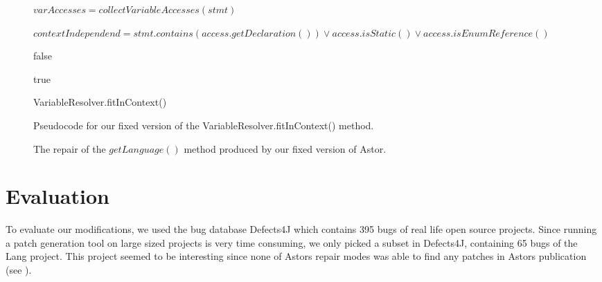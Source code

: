 \documentclass[pdftex,english,oribibl]{llncs}
\begin{document}
\begin{figure}
	\centering
\begin{algorithm}[H]


$varAccesses = collectVariableAccesses(stmt)$\;

{
 $contextIndependend = stmt.contains(access.getDeclaration()) \vee access.isStatic() \vee access.isEnumReference()$ \;

 {
   \Return false\;
 }
}

\Return true\;

\caption{VariableResolver.fitInContext()}
\end{algorithm}
\caption{Pseudocode for our fixed version of the VariableResolver.fitInContext() method.}
\label{fig:fitInContext}
\end{figure}

\begin{figure}
\begin{center}

\end{center}
\caption{The repair of the $getLanguage()$ method produced by our fixed version of Astor.}
\label{fig:fixed}
\end{figure}

\section{Evaluation}\label{sec:evaluation}
To evaluate our modifications, we used the bug database Defects4J which contains 395 bugs of real life open source projects. 
Since running a patch generation tool on large sized projects is very time consuming, we only picked a subset in Defects4J, containing 65 bugs of the Lang project. 
This project seemed to be interesting since none of Astors repair modes was able to find any patches in Astors publication (see \cite{AstorPaper}).
\end{document}
